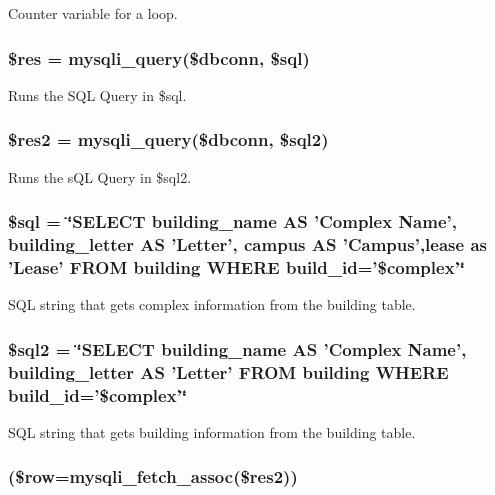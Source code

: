 \-Counter variable for a loop. \hypertarget{upBuildTable_8php_a49a8a4009b02e49717caa88b128affc5}{
\subsubsection[{\$res}]{\setlength{\rightskip}{0pt plus 5cm}\$res = mysqli\-\_\-query(\$dbconn, \$sql)}}\label{upBuildTable_8php_a49a8a4009b02e49717caa88b128affc5}
\-Runs the \-S\-Q\-L \-Query in \$sql. \hypertarget{upBuildTable_8php_a3977504adc01ced790e56cece5e24b60}{
\subsubsection[{\$res2}]{\setlength{\rightskip}{0pt plus 5cm}\$res2 = mysqli\-\_\-query(\$dbconn, \$sql2)}}\label{upBuildTable_8php_a3977504adc01ced790e56cece5e24b60}
\-Runs the s\-Q\-L \-Query in \$sql2. \hypertarget{upBuildTable_8php_a047170d6020a882807665812a27e2525}{
\subsubsection[{\$sql}]{\setlength{\rightskip}{0pt plus 5cm}\$sql = \char`\"{}\-S\-E\-L\-E\-C\-T building\-\_\-name \-A\-S '\-Complex \-Name', building\-\_\-letter \-A\-S '\-Letter', campus \-A\-S '\-Campus',lease as '\-Lease' \-F\-R\-O\-M building \-W\-H\-E\-R\-E build\-\_\-id='\$complex'\char`\"{}}}\label{upBuildTable_8php_a047170d6020a882807665812a27e2525}
\-S\-Q\-L string that gets complex information from the building table. \hypertarget{upBuildTable_8php_a1ad0ffe3fa0755e56a1a6bb40c232b8a}{
\subsubsection[{\$sql2}]{\setlength{\rightskip}{0pt plus 5cm}\$sql2 = \char`\"{}\-S\-E\-L\-E\-C\-T building\-\_\-name \-A\-S '\-Complex \-Name', building\-\_\-letter \-A\-S '\-Letter' \-F\-R\-O\-M building \-W\-H\-E\-R\-E build\-\_\-id='\$complex'\char`\"{}}}\label{upBuildTable_8php_a1ad0ffe3fa0755e56a1a6bb40c232b8a}
\-S\-Q\-L string that gets building information from the building table. \hypertarget{upBuildTable_8php_ac3862ddd2ba0a132de05b14eab1a8e7d}{
\subsubsection[{while}]{(\$row=mysqli\-\_\-fetch\-\_\-assoc(\$res2))}}\label{upBuildTable_8php_ac3862ddd2ba0a132de05b14eab1a8e7d}
